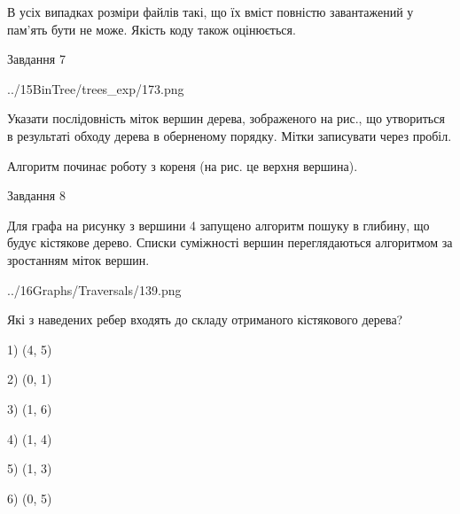 \documentclass[12pt, ukrainian]{article}
\begin{document}
{В усіх випадках розміри файлів такі, що їх вміст повністю завантажений у пам'ять бути не може. Якість коду також оцінюється.



\vspace{10mm}\par

\newpage
\begin{minipage}[t]{9.7cm}
               
{\begin{center}Завдання {7}\end{center}}
\vspace{-4mm}

\begin{center}
	{../15BinTree/trees_exp/173.png}
\end{center}
Указати послідовність міток вершин дерева, зображеного на рис., що утвориться в результаті обходу дерева в оберненому порядку. Мітки записувати через пробіл.\par Алгоритм починає роботу з кореня (на рис. це верхня вершина).\par

\end{minipage}
\vline \hspace{8mm}
\begin{minipage}[t]{8.0cm}
               
{\begin{center}Завдання {8}\end{center}}
\vspace{-4mm}
Для графа на рисунку з вершини 4 запущено алгоритм пошуку в глибину, що будує кістякове дерево. Списки суміжності вершин переглядаються алгоритмом за зростанням міток вершин.\par
\begin{center}
	{../16Graphs/Traversals/139.png}
\end{center}
\par Які з наведених ребер входять до складу отриманого кістякового дерева?\par
1) (4, 5)\par
2) (0, 1)\par
3) (1, 6)\par
4) (1, 4)\par
5) (1, 3)\par
6) (0, 5)\par
{\vskip 15pt} \par


\end{minipage}}
\end{document}
